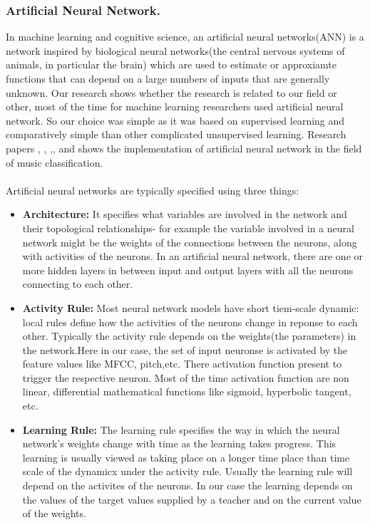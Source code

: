 \subsubsection{Artificial Neural Network.}
In machine learning and cognitive science, an artificial neural networks(ANN) is a network inspired by biological neural networks(the central nervous systems of 
animals, in particular the brain) which are used to estimate or approxiamte functions that can depend on a large numbers of inputs that are generally unknown.
Our research shows whether the research is related to our field or other, most of the time for machine learning researchers used artificial neural network.
So our choice was simple as it was based on supervised learning and comparatively simple than other complicated unsupervised learning.
Research papers \cite{Koerich2013}, \cite{Neumayer2004}, ,\cite{Anglade2010}, \cite{Haggblade2011} and \cite{Kour2015} shows the implementation of artificial neural network in the field of
music classification.\\
\\
Artificial neural networks are typically specified using three things:
\begin{itemize}
        \item \textbf{Architecture:} 
                It specifies what variables are involved in the network and their topological relationships- for example the variable involved
                in a neural network might be the weights of the connections between the neurons, along with activities of the neurons. In an artificial
                neural network, there are one or more hidden layers in between input and output layers with all the neurons connecting to each other.
        \item \textbf{Activity Rule:}
                Most neural network models have short tiem-scale dynamic: local rules define how the activities of the neurons change in reponse to each other.
                Typically the activity rule depends on the weights(the parameters) in the network.Here in our case, the set of input neuronse
                is activated by the feature values like MFCC, pitch,etc. There activation function present to trigger the respective neuron. Most of the time
                activation function are non linear, differential mathematical functions like sigmoid, hyperbolic tangent, etc.
        \item \textbf{Learning Rule:}
                The learning rule specifies the way in which the neural network's weights change with time as the learning takes progress. This learning is usually viewed as 
                taking place on a longer time place than time scale of the dynamicx under the activity rule. Usually the learning rule will depend on the activites of the 
                neurons. In our case the learning depends on the values of the target values supplied by a teacher and on the current value of the weights.
\end{itemize}

